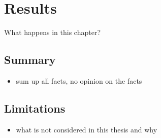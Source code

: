\chapter{Results}

What happens in this chapter?

\section{Summary}

\begin{itemize}
\item sum up all facts, no opinion on the facts
\end{itemize}

\section{Limitations}

\begin{itemize}
\item what is not considered in this thesis and why
\end{itemize}